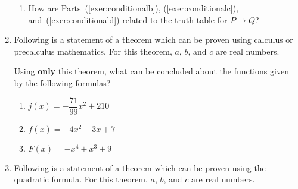 \begin{enumerate}
\begin{enumerate}
  \item How are Parts~(\ref{exer:conditionalb}), (\ref{exer:conditionalc}), and~(\ref{exer:conditionald}) related to the truth table for  \mbox{$P \to Q$}?
  \end{enumerate}

\item \label{exer:sec11-6}%
Following is a statement of a theorem which can be proven using calculus or precalculus mathematics.  For this theorem, $a$, $b$, and $c$ are real numbers. 


Using \textbf{only} this theorem, what can be concluded about the functions given by the following formulas?
\begin{multicols}{2}
\begin{enumerate}
\yitem $g\left( x \right) =  - 8x^2  + 5x - 2$


\yitem $h\left( x \right) =  - \dfrac{1}{3}x^2  + 3x$


\yitem $k\left( x \right) = 8x^2  - 5x - 7$


\item $j\left( x \right) =  - \dfrac{{71}}{{99}}x^2  + 210$


\item $f\left( x \right) =  - 4x^2  - 3x + 7$


\item $F\left( x \right) =  - x^4  + x^3  + 9$
\end{enumerate}
\end{multicols}

\item \label{exer:sec11-7}%
Following is a statement of a theorem which can be proven using the quadratic formula.  For this theorem, $a$, $b$, and $c$ are real numbers. 



\end{enumerate}
